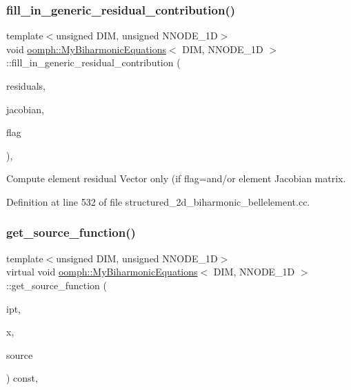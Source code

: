 \subsubsection{\texorpdfstring{fill\+\_\+in\+\_\+generic\+\_\+residual\+\_\+contribution()}{fill\_in\_generic\_residual\_contribution()}}
{\footnotesize\ttfamily template$<$unsigned D\+IM, unsigned N\+N\+O\+D\+E\+\_\+1D$>$ \\
void \hyperlink{classoomph_1_1MyBiharmonicEquations}{oomph\+::\+My\+Biharmonic\+Equations}$<$ D\+IM, N\+N\+O\+D\+E\+\_\+1D $>$\+::fill\+\_\+in\+\_\+generic\+\_\+residual\+\_\+contribution (\begin{DoxyParamCaption}\item[{Vector$<$ double $>$ \&}]{residuals,  }\item[{Dense\+Matrix$<$ double $>$ \&}]{jacobian,  }\item[{const unsigned \&}]{flag }\end{DoxyParamCaption})\hspace{0.3cm}{\ttfamily [protected]}, {\ttfamily [virtual]}}



Compute element residual Vector only (if flag=and/or element Jacobian matrix. 



Definition at line 532 of file structured\+\_\+2d\+\_\+biharmonic\+\_\+bellelement.\+cc.

\mbox{\label{classoomph_1_1MyBiharmonicEquations_a30d824f604ff00b823238d5b18561693}} 
\subsubsection{\texorpdfstring{get\+\_\+source\+\_\+function()}{get\_source\_function()}}
{\footnotesize\ttfamily template$<$unsigned D\+IM, unsigned N\+N\+O\+D\+E\+\_\+1D$>$ \\
virtual void \hyperlink{classoomph_1_1MyBiharmonicEquations}{oomph\+::\+My\+Biharmonic\+Equations}$<$ D\+IM, N\+N\+O\+D\+E\+\_\+1D $>$\+::get\+\_\+source\+\_\+function (\begin{DoxyParamCaption}\item[{const unsigned \&}]{ipt,  }\item[{const Vector$<$ double $>$ \&}]{x,  }\item[{double \&}]{source }\end{DoxyParamCaption}) const\hspace{0.3cm}{\ttfamily [inline]}, {\ttfamily [virtual]}}

